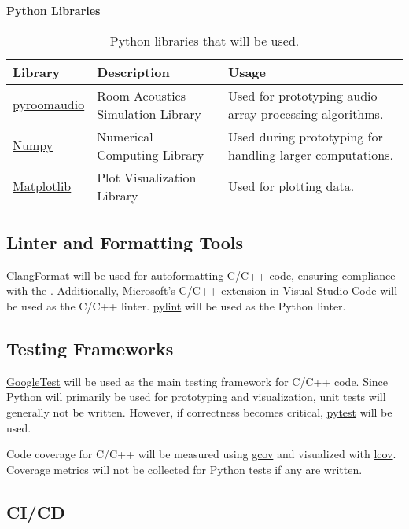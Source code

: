 \documentclass{article}
\begin{document}
\textbf{Python Libraries}
\begin{table}[h!]
\centering
\begin{tabularx}{\textwidth}{|l|X|X|}
\hline
\textbf{Library} & \textbf{Description} & \textbf{Usage} \\ \hline
\href{https://pypi.org/project/pyroomacoustics/}{pyroomaudio} & Room Acoustics Simulation Library  & Used for prototyping audio array processing algorithms. \\ \hline
\href{https://numpy.org/}{Numpy} & Numerical Computing Library  & Used during prototyping for handling larger computations. \\ \hline
\href{https://matplotlib.org/}{Matplotlib} & Plot Visualization Library  & Used for plotting data. \\ \hline
\end{tabularx}
\caption{Python libraries that will be used.}
\end{table}

\subsection{Linter and Formatting Tools}

\href{https://clang.llvm.org/docs/ClangFormat.html}{ClangFormat} will be used for autoformatting C/C++ code, ensuring compliance with the .
Additionally, Microsoft’s \href{https://code.visualstudio.com/docs/languages/cpp}{C/C++ extension} in Visual Studio Code will be used as the C/C++ linter.
\href{https://pypi.org/project/pylint/}{pylint} will be used as the Python linter.

\subsection{Testing Frameworks}
\href{https://github.com/google/googletest}{GoogleTest} will be used as the main testing framework for C/C++ code.
Since Python will primarily be used for prototyping and visualization, unit tests will generally not be written. However, if correctness becomes critical, \href{https://docs.pytest.org/}{pytest} will be used.

Code coverage for C/C++ will be measured using \href{https://gcc.gnu.org/onlinedocs/gcc/Gcov.html}{gcov} and visualized with \href{https://wiki.documentfoundation.org/Development/Lcov}{lcov}.
Coverage metrics will not be collected for Python tests if any are written.

\subsection{CI/CD}
\end{document}
